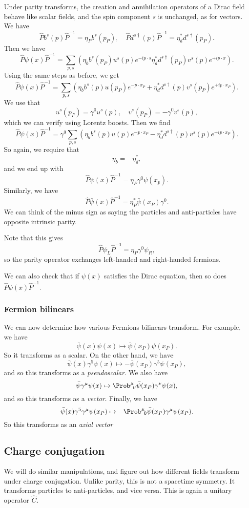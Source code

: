 \documentclass[a4paper]{article}
\begin{document}
Under parity transforms, the creation and annihilation operators of a Dirac field behave like scalar fields, and the spin component $s$ is unchanged, as for vectors. We have
\[
  \hat{P} b^s(p) \hat{P}^{-1} = \eta_P b^s(p_P),\quad \hat{P} d^{s\dagger}(p) \hat{P}^{-1} = \eta_d^* d^{s\dagger}(p_P).
\]
Then we have
\[
  \hat{P} \psi(x) \hat{P}^{-1} = \sum_{p, s} \left(\eta_b b^s(p_P) u^s(p) e^{-ip\cdot s} \eta_d^* d^{s\dagger} (p_P) v^s(p) e^{+ip\cdot x}\right).
\]
Using the same steps as before, we get
\[
  \hat{P}\psi(x) \hat{P}^{-1} = \sum_{p, s}\left( \eta_b b^s(p) u(p_P) e^{-p\cdot x_P} + \eta_d^* d^{s\dagger}(p) v^s(p_P) e^{+ip\cdot x_P}\right).
\]
We use that
\[
  u^s(p_P) = \gamma^0 u^s(p),\quad v^s(p_P) = - \gamma^0 v^s(p),
\]
which we can verify using Lorentz boosts. Then we find
\[
  \hat{P} \psi(x) \hat{P}^{-1} = \gamma^0 \sum_{p, s}\left( \eta_b b^s(p) u(p) e^{-p\cdot x_P} - \eta_d^* d^{s\dagger}(p) v^s(p) e^{+ip\cdot x_P}\right).
\]
So again, we require that
\[
  \eta_b = - \eta_d^*,
\]
and we end up with
\[
  \hat{P} \psi(x) \hat{P}^{-1} = \eta_P \gamma^0 \psi(x_p).
\]
Similarly, we have
\[
  \hat{P} \bar\psi(x) \hat{P}^{-1} = \eta_P^* \bar\psi(x_P) \gamma^0.
\]
We can think of the minus sign as saying the particles and anti-particles have opposite intrinsic parity.

Note that this gives
\[
  \hat{P} \psi_L \hat{P}^{-1} = \eta_P \gamma^0 \psi_R,
\]
so the parity operator exchanges left-handed and right-handed fermions.

We can also check that if $\psi(x)$ satisfies the Dirac equation, then so does $\hat{P} \psi(x) \hat{P}^{-1}$.

\subsubsection*{Fermion bilinears}
We can now determine how various Fermions bilinears transform. For example, we have
\[
  \bar\psi(x) \psi(x) \mapsto \bar\psi(x_P) \psi(x_P).
\]
So it transforms as a scalar. On the other hand, we have
\[
  \bar\psi(x) \gamma^5 \psi(x) \mapsto - \bar{\psi}(x_P) \gamma^5 \psi(x_P),
\]
and so this transforms as a \emph{pseudoscalar}. We also have
\[
  \bar\psi \gamma^\mu \psi(x) \mapsto \Prob^\mu\!_\nu \bar\psi(x_P) \gamma^\nu \psi(x),
\]
and so this transforms as a \emph{vector}. Finally, we have
\[
  \bar\psi(x) \gamma^5 \gamma^\mu \psi(x_P) \mapsto - \Prob^\mu\!_0 \bar\psi(x_P) \gamma^\mu \psi(x_P).
\]
So this transforms as an \emph{axial vector}
\subsection{Charge conjugation}
We will do similar manipulations, and figure out how different fields transform under charge conjugation. Unlike parity, this is not a spacetime symmetry. It transforms particles to anti-particles, and vice versa. This is again a unitary operator $\hat{C}$.
\end{document}
